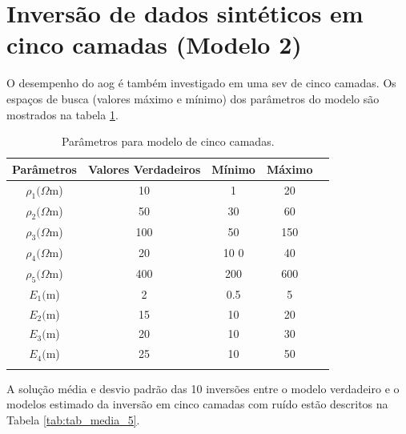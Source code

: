\section{Inversão de dados sintéticos em cinco camadas (Modelo 2)}
\label{sec:inversao_5_sintetico}
O desempenho do \ac{aog} é também investigado em uma \ac{sev} de cinco camadas. Os espaços de busca (valores máximo e mínimo) dos parâmetros do modelo são mostrados na tabela \ref{tab:tab_sint_5}.


\begin{table}[H]
    \centering
    \caption{Parâmetros para modelo de cinco camadas.}
    \begin{tabular}{@{}ccccc@{}}
        \toprule
        \textbf{Parâmetros}  & \textbf{Valores Verdadeiros} & \textbf{Mínimo}      & \textbf{Máximo}      \\ \midrule
        $\rho_1(\Omega$m)    & 10                           & 1                    & 20                   \\
        $\rho_2(\Omega$m)    & 50                           & 30                   & 60                   \\
        $\rho_3(\Omega$m)    & 100                          & 50                   & 150                  \\
        $\rho_4(\Omega$m)    & 20                           & 10 0                 & 40                   \\
        $\rho_5(\Omega$m)    & 400                          & 200                  & 600                  \\
        $E_1($m)             & 2                            & 0.5                  & 5                    \\
        $E_2($m)             & 15                           & 10                   & 20                   \\
        $E_3($m)             & 20                           & 10                   & 30                   \\
        $E_4($m)             & 25                           & 10                   & 50                   \\
        \multicolumn{1}{l}{} & \multicolumn{1}{l}{}         & \multicolumn{1}{l}{} & \multicolumn{1}{l}{} \\ \bottomrule
    \end{tabular}
    \label{tab:tab_sint_5}
\end{table}

 A solução média e desvio padrão das 10 inversões entre o modelo verdadeiro e o modelos estimado da inversão em cinco camadas com ruído estão descritos na Tabela \ref{tab:tab_media_5}.


